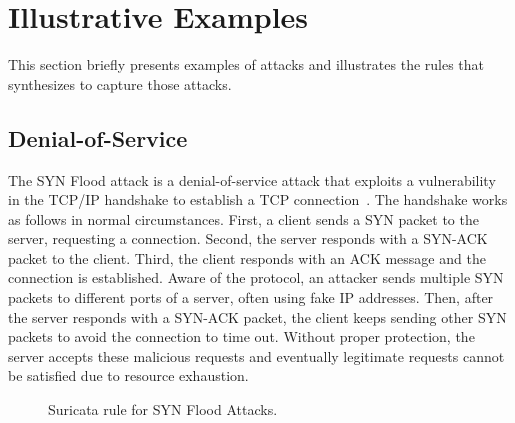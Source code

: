 \documentclass[sigconf,anonymous]{acmart}
\begin{document}


\section{Illustrative Examples}
\label{sec:suri-metas-coverage}

This section briefly presents examples of attacks and illustrates the
rules that \tname{} synthesizes to capture those attacks.


\subsection{Denial-of-Service}

The SYN Flood attack is a denial-of-service attack that exploits a vulnerability in the TCP/IP handshake
to establish a TCP connection~\cite{cloudfare-synflood}. The handshake
works as follows in normal circumstances. First, a client sends a SYN
packet to the server, requesting a connection. Second, the server
responds with a SYN-ACK packet to the client. Third, the client
responds with an ACK message and the connection is established. Aware
of the protocol, an attacker sends multiple SYN packets to different
ports of a server, often using fake IP addresses. Then, after the
server responds with a SYN-ACK packet, the client keeps sending other
SYN packets to avoid the connection to time out. Without proper
protection, the server accepts these malicious requests and eventually
legitimate requests cannot be satisfied due to resource exhaustion.

\begin{figure}[h!]
  
  \caption{Suricata rule for SYN Flood Attacks.}
  \label{fig:synflood-example}
\end{figure}
\end{document}
